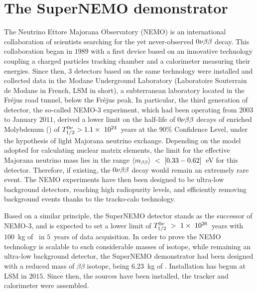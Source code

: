 \chapter{The SuperNEMO demonstrator}
\label{ch:detector}

The Neutrino Ettore Majorana Observatory (NEMO) is an international collaboration of scientists searching for the yet never-observed $0\nu\beta\beta$ decay.
This collaboration began in $1989$ with a first device based on an innovative technology coupling a charged particles tracking chamber and a calorimeter measuring their energies.
Since then, $3$ detectors based on the same technology were installed and collected data in the Modane Underground Laboratory (Laboratoire Souterrain de Modane in French, LSM in short), a subterranean laboratory located in the Fréjus road tunnel, below the Fréjus peak.
In particular, the third generation of detector, the so-called NEMO-$3$ experiment, which had been operating from $2003$ to January $2011$, derived a lower limit on the half-life of $0\nu\beta\beta$ decays of enriched Molybdenum (\Mo) of $T_{1/2}^{0\nu}>1.1\times~10^{24}$~years at the $90$\% Confidence Level, under the hypothesis of light Majorana neutrino exchange.
Depending on the model adopted for calculating nuclear matrix elements, the limit for the effective Majorana neutrino mass lies in the range $\langle m_{\beta\beta}\rangle~<~[0.33-0.62]$~eV for this detector.
Therefore, if existing, the $0\nu\beta\beta$ decay would remain an extremely rare event.
The NEMO experiments have then been designed to be ultra-low background detectors, reaching high radiopurity levels, and efficiently removing background events thanks to the tracko-calo technology.

Based on a similar principle, the SuperNEMO detector stands as the successor of NEMO-$3$, and is expected to set a lower limit of $T_{1/2}^{0\nu}~>~1\times~10^{26}$~years with $100$~kg of \Se\ in $5$~years of data acquisition.
In order to prove the NEMO technology is scalable to such considerable masses of isotope, while remaining an ultra-low background detector, the SuperNEMO demonstrator had been designed with a reduced mass of $\beta\beta$ isotope, being $6.23$~kg of \Se.
Installation has begun at LSM in $2015$.
Since then, the sources have been installed, the tracker and calorimeter were assembled.

